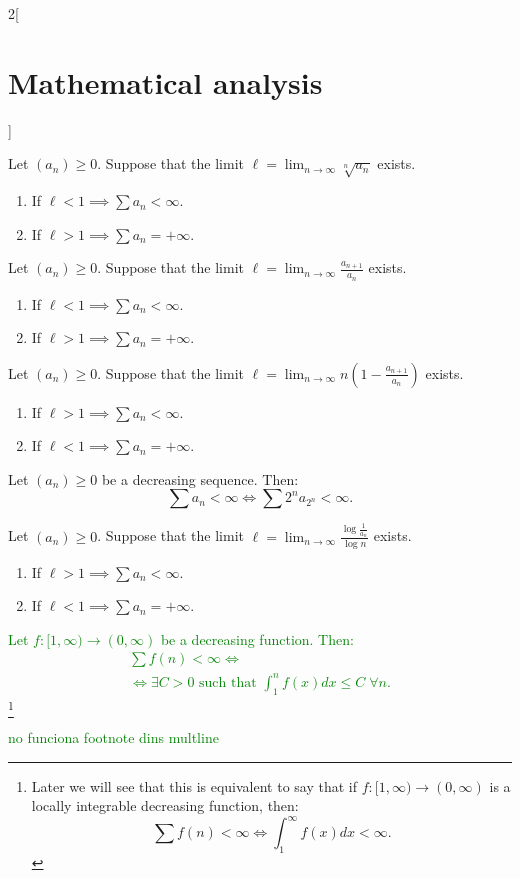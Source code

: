 \documentclass[class=article,crop=false]{standalone}
\begin{document}
\begin{multicols}{2}[\section{Mathematical analysis}]
\begin{theorem}
\begin{enumerate}
\end{enumerate}
\end{theorem}
\begin{theorem}
Let $(a_n)\geq 0$. Suppose that the limit $\displaystyle \ell=\lim_{n\to\infty}\sqrt[n]{a_n}$ exists.
\begin{enumerate}
    \item If $\ell<1\implies\sum a_n<\infty$.
    \item If $\ell>1\implies\sum a_n=+\infty$.
\end{enumerate}
\end{theorem}
\begin{theorem}
Let $(a_n)\geq 0$. Suppose that the limit $\displaystyle \ell=\lim_{n\to\infty}\frac{a_{n+1}}{a_n}$ exists.
\begin{enumerate}
    \item If $\ell<1\implies\sum a_n<\infty$.
    \item If $\ell>1\implies\sum a_n=+\infty$.
\end{enumerate}
\end{theorem}
\begin{theorem}
Let $(a_n)\geq 0$. Suppose that the limit $\displaystyle \ell=\lim_{n\to\infty}n\left(1-\frac{a_{n+1}}{a_n}\right)$ exists.
\begin{enumerate}
    \item If $\ell>1\implies\sum a_n<\infty$.
    \item If $\ell<1\implies\sum a_n=+\infty$.
\end{enumerate}
\end{theorem}
\begin{theorem}
Let $(a_n)\geq 0$ be a decreasing sequence. Then: $$\textstyle\sum a_n<\infty\iff\sum 2^na_{2^n}<\infty.$$
\end{theorem}
\begin{theorem}
Let $(a_n)\geq 0$. Suppose that the limit $\displaystyle \ell=\lim_{n\to\infty}\frac{\log\frac{1}{a_n}}{\log n}$ exists.
\begin{enumerate}
    \item If $\ell>1\implies\sum a_n<\infty$.
    \item If $\ell<1\implies\sum a_n=+\infty$.
\end{enumerate}
\end{theorem}
\textcolor{green}{\begin{theorem}
Let $f:[1,\infty)\rightarrow(0,\infty)$ be a decreasing function. Then: 
\begin{multline*}
    \textstyle\sum f(n)<\infty\iff\\\displaystyle\iff\exists C>0\text{ such that }\int_1^nf(x)dx\leq C\;\forall n.
\end{multline*}
\footnote{Later we will see that this is equivalent to say that if $f:[1,\infty)\rightarrow(0,\infty)$ is a locally integrable decreasing function, then: $$\sum f(n)<\infty\iff\int_1^\infty f(x)dx<\infty.$$}
\end{theorem}
no funciona footnote dins multline}

\end{multicols}
\end{document}

